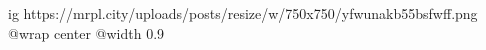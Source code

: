  
 
 
 
 

\ifcmt
  ig https://mrpl.city/uploads/posts/resize/w/750x750/yfwunakb55bsfwff.png
  @wrap center
  @width 0.9
\fi
